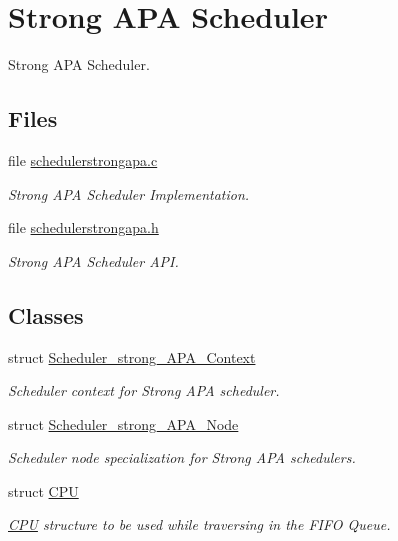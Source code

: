\hypertarget{group__RTEMSScoreSchedulerStrongAPA}{}\section{Strong A\+PA Scheduler}
\label{group__RTEMSScoreSchedulerStrongAPA}


Strong A\+PA Scheduler.  


\subsection*{Files}
\begin{DoxyCompactItemize}
\item 
file \hyperlink{schedulerstrongapa_8c}{schedulerstrongapa.\+c}
\begin{DoxyCompactList}\small\item\em Strong A\+PA Scheduler Implementation. \end{DoxyCompactList}\item 
file \hyperlink{schedulerstrongapa_8h}{schedulerstrongapa.\+h}
\begin{DoxyCompactList}\small\item\em Strong A\+PA Scheduler A\+PI. \end{DoxyCompactList}\end{DoxyCompactItemize}
\subsection*{Classes}
\begin{DoxyCompactItemize}
\item 
struct \hyperlink{structScheduler__strong__APA__Context}{Scheduler\+\_\+strong\+\_\+\+A\+P\+A\+\_\+\+Context}
\begin{DoxyCompactList}\small\item\em Scheduler context for Strong A\+PA scheduler. \end{DoxyCompactList}\item 
struct \hyperlink{structScheduler__strong__APA__Node}{Scheduler\+\_\+strong\+\_\+\+A\+P\+A\+\_\+\+Node}
\begin{DoxyCompactList}\small\item\em Scheduler node specialization for Strong A\+PA schedulers. \end{DoxyCompactList}\item 
struct \hyperlink{structCPU}{C\+PU}
\begin{DoxyCompactList}\small\item\em \hyperlink{structCPU}{C\+PU} structure to be used while traversing in the F\+I\+FO Queue. \end{DoxyCompactList}\end{DoxyCompactItemize}
